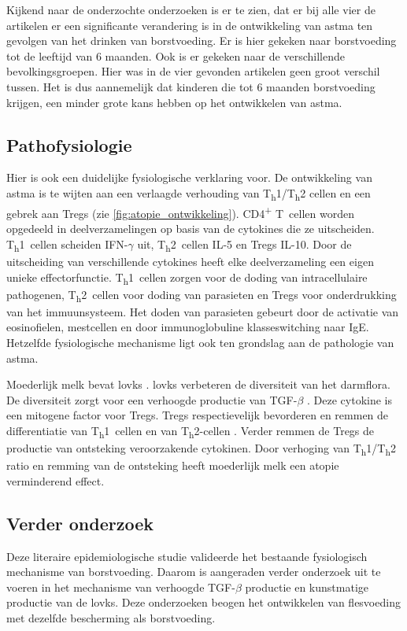 \documentclass[abstract=true]{scrartcl}
\begin{document}
Kijkend naar de onderzochte onderzoeken is er te zien, dat er bij alle vier de artikelen er een significante verandering is in de ontwikkeling van astma ten gevolgen van het drinken van borstvoeding. Er is hier gekeken naar borstvoeding tot de leeftijd van 6 maanden. Ook is er gekeken naar de verschillende bevolkingsgroepen. Hier was in de vier gevonden artikelen geen groot verschil tussen. Het is dus aannemelijk dat kinderen die tot 6 maanden borstvoeding krijgen, een minder grote kans hebben op het ontwikkelen van astma.


\subsection{Pathofysiologie}
Hier is ook een duidelijke fysiologische verklaring voor.
De ontwikkeling van astma is te wijten aan een verlaagde verhouding van T\textsubscript{h}1/T\textsubscript{h}2 cellen en een gebrek aan Tregs (zie \cref{fig:atopie_ontwikkeling}). CD4\textsuperscript{+} T~cellen worden opgedeeld in deelverzamelingen op basis van de cytokines die ze uitscheiden. T\textsubscript{h}1~cellen scheiden IFN-$\gamma$ uit, T\textsubscript{h}2~cellen IL-5 en Tregs IL-10. Door de uitscheiding van verschillende cytokines heeft elke deelverzameling een eigen unieke effectorfunctie. T\textsubscript{h}1~cellen zorgen voor de doding van intracellulaire pathogenen, T\textsubscript{h}2~cellen voor doding van parasieten en Tregs voor onderdrukking van het immuunsysteem. Het doden van parasieten gebeurt door de activatie van eosinofielen, mestcellen en door immunoglobuline klasseswitching naar IgE. Hetzelfde fysiologische mechanisme ligt ook ten grondslag aan de pathologie van astma.

Moederlijk melk bevat \glspl{lovk} \cite{das2002essential}. \Glspl{lovk} verbeteren de diversiteit van het darmflora. De diversiteit zorgt voor een verhoogde productie van TGF-$\beta$ \cite{das2002essential,Das_2004}. Deze cytokine is een mitogene factor voor Tregs. Tregs respectievelijk bevorderen en remmen de differentiatie van T\textsubscript{h}1~cellen en van T\textsubscript{h}2-cellen \cite{penttila2010milk}. Verder remmen de Tregs de productie van ontsteking veroorzakende cytokinen. Door verhoging van T\textsubscript{h}1/T\textsubscript{h}2 ratio en remming van de ontsteking heeft moederlijk melk een atopie verminderend effect.

\subsection{Verder onderzoek}
Deze literaire epidemiologische studie valideerde het bestaande fysiologisch mechanisme van borstvoeding. Daarom is aangeraden verder onderzoek uit te voeren in het mechanisme van verhoogde TGF-$\beta$ productie en kunstmatige productie van de \glspl{lovk}. Deze onderzoeken beogen het ontwikkelen van flesvoeding met dezelfde bescherming als borstvoeding.

\printglossaries
\newpage
\printbibliography 
\end{document}
